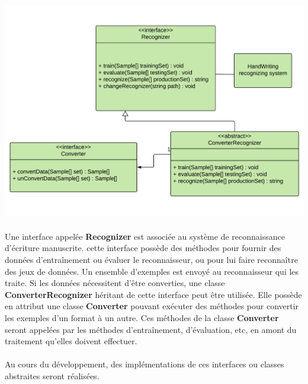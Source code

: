 \newpage

\begin{mdframed}[frametitle={Figure 14 : Diagramme de classes de l'interface avec le système de reconnaissance d'écriture manuscrite}, innerbottommargin=10]
\begin{center}
\includegraphics[scale=0.5]{interface-reconnaisseur.pdf}
\end{center}
\end{mdframed}

\paragraph{}
Une interface appelée \textbf{Recognizer} est associée au système de
reconnaissance d’écriture manuscrite. cette interface possède des méthodes
pour fournir des données d'entraînement ou  évaluer le reconnaisseur, ou pour lui faire reconnaître
des jeux de données. Un ensemble d’exemples est envoyé au reconnaisseur qui
les traite. Si les données nécessitent d’être converties, une classe
\textbf{ConverterRecognizer} héritant de cette interface peut être utilisée.
Elle possède en attribut une classe \textbf{Converter} pouvant exécuter des
méthodes pour convertir les exemples d’un format à un autre. Ces méthodes de
la classe \textbf{Converter} seront appelées par les méthodes d’entraînement,
d’évaluation, etc, en amont du traitement qu’elles doivent effectuer.

\paragraph{}
Au cours du développement, des implémentations de ces interfaces ou classes
abstraites seront réalisées.

